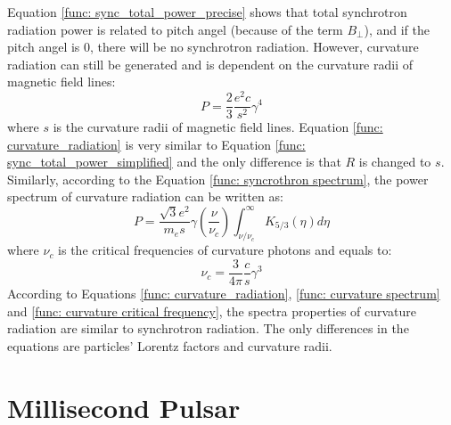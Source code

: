 \documentclass[12pt]{report}
\begin{document}
      Equation \ref{func: sync_total_power_precise} shows that total synchrotron radiation 
      power is related to pitch angel (because of the term $B_\perp$), and if the 
      pitch angel is $0$, there will be no synchrotron radiation. However, curvature 
      radiation can still be generated and is dependent on the curvature radii of 
      magnetic field lines:
      \begin{equation}
        \label{func: curvature_radiation}
        P = \frac{2}{3}\frac{e^2c}{s^2}\gamma^4
      \end{equation}
      where $s$ is the curvature radii of magnetic field lines. 
      Equation \ref{func: curvature_radiation} is very similar to Equation 
      \ref{func: sync_total_power_simplified} and the only difference is that 
      $R$ is changed to $s$. Similarly, according to the Equation 
      \ref{func: syncrothron spectrum}, the power spectrum of curvature radiation can 
      be written as:
      \begin{equation}
        \label{func: curvature spectrum}
        P = \frac{\sqrt{3}e^2}{m_es}\gamma \left(\frac{\nu}{\nu_c}\right) \int_{\nu / \nu_c}^{\infty} K_{5/3}\left(\eta \right)d\eta
      \end{equation}
      where $\nu_c$ is the critical frequencies of curvature photons and equals to:
      \begin{equation}
        \label{func: curvature critical frequency}
        \nu_c = \frac{3}{4\pi}\frac{c}{s}\gamma^3
      \end{equation}
      According to Equations \ref{func: curvature_radiation}, \ref{func: curvature spectrum} 
      and \ref{func: curvature critical frequency}, the spectra properties of curvature 
      radiation are similar to synchrotron radiation. The only differences in the 
      equations are particles' Lorentz factors and curvature radii. 


  \section{Millisecond Pulsar} 
\end{document}
